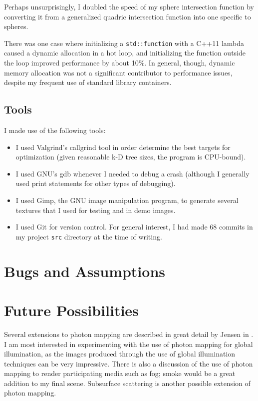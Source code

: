 \documentclass{article}
\begin{document}
Perhaps unsurprisingly, I doubled the speed of my sphere intersection function
by converting it from a generalized quadric intersection function into one
specific to spheres.

There was one case where initializing a {\tt std::function} with a C++11
lambda caused a dynamic allocation in a hot loop, and initializing
the function outside the loop improved performance by about 10\%. In general,
though, dynamic memory allocation was not a significant contributor to
performance issues, despite my frequent use of standard library containers.

\subsection{Tools}

I made use of the following tools:

\begin{itemize}
  \item I used Valgrind's callgrind tool in order determine the best targets for
optimization (given reasonable k-D tree sizes, the program is CPU-bound).

  \item I used GNU's gdb whenever I needed to debug a crash (although I generally used
print statements for other types of debugging).

  \item I used Gimp, the GNU image manipulation program, to generate several textures
that I used for testing and in demo images.

  \item I used Git for version control. For general interest, I had made $68$ commits
in my project {\tt src} directory at the time of writing.
\end{itemize}

\section{Bugs and Assumptions}


\section{Future Possibilities}

Several extensions to photon mapping are described in great detail by Jensen in
\cite{coursenotes}. I am most interested in experimenting with the use of photon
mapping for global illumination, as the images produced through the use of
global illumination techniques can be very impressive. There is also a discussion
of the use of photon mapping to render participating media such as fog; smoke would
be a great addition to my final scene. Subsurface scattering is another possible
extension of photon mapping.
\end{document}
